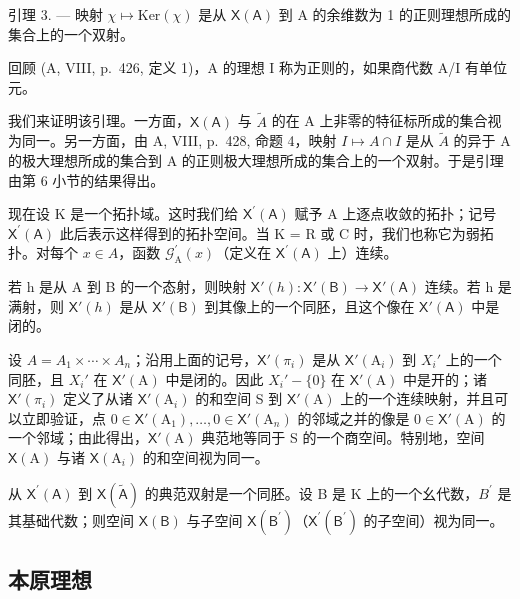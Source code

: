 引理 3. --- 映射 \(\chi \mapsto \mathrm{Ker}(\chi)\) 是从 \(\mathsf{X}(\mathsf{A})\) 到 A 的余维数为 1 的正则理想所成的集合上的一个双射。

回顾 (A, VIII, p.~426, 定义 1)，A 的理想 I 称为正则的，如果商代数 A/I 有单位元。

我们来证明该引理。一方面，\(\mathsf{X}(\mathsf{A})\) 与 \(\widetilde{A}\) 的在 A 上非零的特征标所成的集合视为同一。另一方面，由 A, VIII, p.~428, 命题 4，映射 \(I \mapsto A \cap I\) 是从 \(\widetilde{A}\) 的异于 A 的极大理想所成的集合到 A 的正则极大理想所成的集合上的一个双射。于是引理由第 6 小节的结果得出。

现在设 K 是一个拓扑域。这时我们给 \(\mathsf{X}^{\prime}(\mathsf{A})\) 赋予 A 上逐点收敛的拓扑；记号 \(\mathsf{X}^{\prime}(\mathsf{A})\) 此后表示这样得到的拓扑空间。当 K = R 或 C 时，我们也称它为弱拓扑。对每个 \(x \in A\)，函数 \(\mathcal{G}_{\mathrm{A}}^{\prime}(x)\)（定义在 \(\mathsf{X}^{\prime}(\mathsf{A})\) 上）连续。

若 h 是从 A 到 B 的一个态射，则映射 \(\mathsf{X}'(h)\colon\mathsf{X}'(\mathsf{B})\to\mathsf{X}'(\mathsf{A})\) 连续。若 h 是满射，则 \(\mathsf{X}'(h)\) 是从 \(\mathsf{X}'(\mathsf{B})\) 到其像上的一个同胚，且这个像在 \(\mathsf{X}'(\mathsf{A})\) 中是闭的。

设 \(A = A_{1} \times \cdots \times A_{n}\)；沿用上面的记号，\(\mathsf{X}'(\pi_{i})\) 是从 \(\mathsf{X}'(\mathrm{A}_{i})\) 到 \(X_{i}'\) 上的一个同胚，且 \(X_{i}'\) 在 \(\mathsf{X}'(\mathrm{A})\) 中是闭的。因此 \(X_{i}' - \{0\}\) 在 \(\mathsf{X}'(\mathrm{A})\) 中是开的；诸 \(\mathsf{X}'(\pi_{i})\) 定义了从诸 \(\mathsf{X}'(\mathrm{A}_{i})\) 的和空间 S 到 \(\mathsf{X}'(\mathrm{A})\) 上的一个连续映射，并且可以立即验证，点 \(0 \in \mathsf{X}'(\mathrm{A}_{1}), \ldots, 0 \in \mathsf{X}'(\mathrm{A}_{n})\) 的邻域之并的像是 \(0 \in \mathsf{X}'(\mathrm{A})\) 的一个邻域；由此得出，\(\mathsf{X}'(\mathrm{A})\) 典范地等同于 S 的一个商空间。特别地，空间 \(\mathsf{X}(\mathrm{A})\) 与诸 \(\mathsf{X}(\mathrm{A}_{i})\) 的和空间视为同一。

从 \(\mathsf{X}^{\prime}(\mathsf{A})\) 到 \(\mathsf{X}(\tilde{\mathsf{A}})\) 的典范双射是一个同胚。设 B 是 K 上的一个幺代数，\(B^{\prime}\) 是其基础代数；则空间 \(\mathsf{X}(\mathsf{B})\) 与子空间 \(\mathsf{X}(\mathsf{B}^{\prime})\)（\(\mathsf{X}^{\prime}(\mathsf{B}^{\prime})\) 的子空间）视为同一。

\subsection{本原理想}

